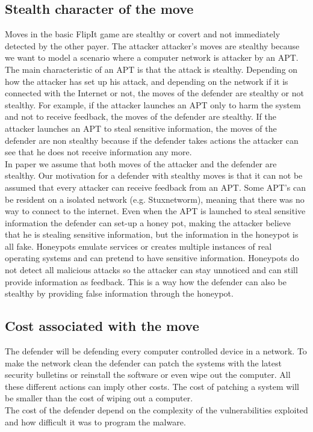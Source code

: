 \subsection{Stealth character of the move}
Moves in the basic FlipIt game are stealthy or covert and not immediately detected by the other payer. The attacker attacker's moves are stealthy because we want to model a scenario where a computer network is attacker by an APT. The main characteristic of an APT is that the attack is stealthy. Depending on how the attacker has set up his attack, and depending on the network if it is connected with the Internet or not, the moves of the defender are stealthy or not stealthy. For example, if the attacker launches an APT only to harm the system and not to receive feedback, the moves of the defender are stealthy. If the attacker launches an APT to steal sensitive information, the moves of the defender are non stealthy because if the defender takes actions the attacker can see that he does not receive information any more. \\
In paper we assume that both moves of the attacker and the defender are stealthy. Our motivation for a defender with stealthy moves is that it can not be assumed that every attacker can receive feedback from an APT. Some APT's can be resident on a isolated network (e.g. Stuxnetworm), meaning that there was no way to connect to the internet.
Even when the APT is launched to steal sensitive information the defender can set-up a honey pot, making the attacker believe that he is stealing sensitive information, but the information in the honeypot is all fake. Honeypots emulate services or creates multiple instances of real operating systems and can pretend to have sensitive information.  Honeypots do not detect all malicious attacks so the attacker can stay unnoticed and can still provide information as feedback. This is a way how the defender can also be stealthy by providing  false information through the honeypot.\\


  
\subsection{Cost associated with the move}
 The defender will be defending every computer controlled device in a network. To make the network clean the defender can patch the systems with the latest security bulletins or reinstall the software or even wipe out the computer. All these different actions can imply other costs. The cost of patching a system will be smaller than the cost of wiping out a computer. \\ 
The cost of the defender depend on the complexity of the vulnerabilities exploited and how difficult it was to program the malware.
